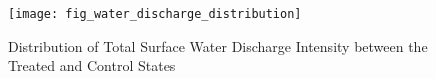 \begin{figure}[H]
    \centering
    \texttt{[image: fig\_water\_discharge\_distribution]}
    \caption{Distribution of Total Surface Water Discharge Intensity between the Treated and Control States}
    \label{fig:water-discharge-distribution}
\end{figure}